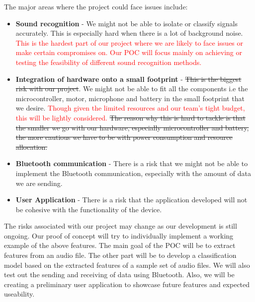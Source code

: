 \documentclass[12pt, titlepage]{article}
\begin{document}
The major areas where the project could face issues include: 
\begin{itemize}
	\item \textbf{Sound recognition} - We might not be able to isolate or classify signals accurately. This is especially hard when there is a lot of background noise. \textcolor{red}{This is the hardest part of our project where we are likely to face issues or make certain compromises on. Our POC will focus mainly on achieving or testing the feasibility of different sound recognition methods.}
	\item \textbf{Integration of hardware onto a small footprint} - \sout{This is the biggest risk with our project}. We might not be able to fit all the components i.e the microcontroller, motor, microphone and battery in the small footprint that we desire. \textcolor{red}{Though given the limited resources and our team's tight budget, this will be lightly considered.} \sout{The reason why this is hard to tackle is that the smaller we go with our hardware, especially microcontroller and battery, the more cautious we have to be with power consumption and resource allocation. }
	\item \textbf{Bluetooth communication} - There is a  risk that we might not be able to implement the Bluetooth communication, especially with the amount of data we are sending.  
	\item \textbf{User Application} - There is a risk that the application developed will not be cohesive with the functionality of the device. 
\end{itemize} 
The risks associated with our project may change as our development is still ongoing. 
Our proof of concept will try to individually implement a working example of the above features. The main goal of the POC will be to extract features from an audio file. The other part will be to develop a classification model based on the extracted features of a sample set of audio files.
We will also test out the sending and receiving of data using Bluetooth. Also, we will be creating a preliminary user application to showcase future features and expected useability. 
\end{document}
